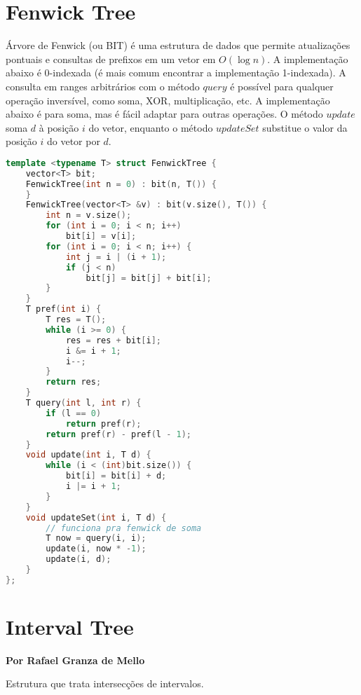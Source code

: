 \documentclass[11pt, a4paper, oneside]{book}
\begin{document}
\hfill

\section{Fenwick Tree}


Árvore de Fenwick (ou BIT) é uma estrutura de dados que permite atualizações pontuais e consultas de prefixos em um vetor em $O(\log n)$. A implementação abaixo é 0-indexada (é mais comum encontrar a implementação 1-indexada). A consulta em ranges arbitrários com o método $query$ é possível para qualquer operação inversível, como soma, XOR, multiplicação, etc. A implementação abaixo é para soma, mas é fácil adaptar para outras operações. O método $update$ soma $d$ à posição $i$ do vetor, enquanto o método $updateSet$ substitue o valor da posição $i$ do vetor por $d$.
\hfill

\begin{multicols}{2}
\begin{lstlisting}[language=C++]
template <typename T> struct FenwickTree {
    vector<T> bit;
    FenwickTree(int n = 0) : bit(n, T()) {
    }
    FenwickTree(vector<T> &v) : bit(v.size(), T()) {
        int n = v.size();
        for (int i = 0; i < n; i++)
            bit[i] = v[i];
        for (int i = 0; i < n; i++) {
            int j = i | (i + 1);
            if (j < n)
                bit[j] = bit[j] + bit[i];
        }
    }
    T pref(int i) {
        T res = T();
        while (i >= 0) {
            res = res + bit[i];
            i &= i + 1;
            i--;
        }
        return res;
    }
    T query(int l, int r) {
        if (l == 0)
            return pref(r);
        return pref(r) - pref(l - 1);
    }
    void update(int i, T d) {
        while (i < (int)bit.size()) {
            bit[i] = bit[i] + d;
            i |= i + 1;
        }
    }
    void updateSet(int i, T d) {
        // funciona pra fenwick de soma
        T now = query(i, i);
        update(i, now * -1);
        update(i, d);
    }
};
\end{lstlisting}
\end{multicols}

\hfill

\section{Interval Tree}


\textbf{Por Rafael Granza de Mello}



Estrutura que trata intersecções de intervalos.
\end{document}
